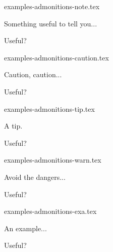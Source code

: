 \begin{filecontents*}[overwrite]{examples-admonitions-note.tex}
\begin{tdocnote}
    Something useful to tell you...
\end{tdocnote}

\begin{tdocnote}
    Useful?
\end{tdocnote}
\end{filecontents*}


\begin{filecontents*}[overwrite]{examples-admonitions-caution.tex}
\begin{tdoccaut}
    Caution, caution...
\end{tdoccaut}

\begin{tdoccaut}
    Useful?
\end{tdoccaut}
\end{filecontents*}


\begin{filecontents*}[overwrite]{examples-admonitions-tip.tex}
\begin{tdoctip}
    A tip.
\end{tdoctip}

\begin{tdoctip}
    Useful?
\end{tdoctip}
\end{filecontents*}


\begin{filecontents*}[overwrite]{examples-admonitions-warn.tex}
\begin{tdocwarn}
    Avoid the dangers...
\end{tdocwarn}

\begin{tdocwarn}
    Useful?
\end{tdocwarn}
\end{filecontents*}


\begin{filecontents*}[overwrite]{examples-admonitions-exa.tex}
\begin{tdocexa}
    An example...
\end{tdocexa}

\begin{tdocexa}
    Useful?
\end{tdocexa}
\end{filecontents*}


